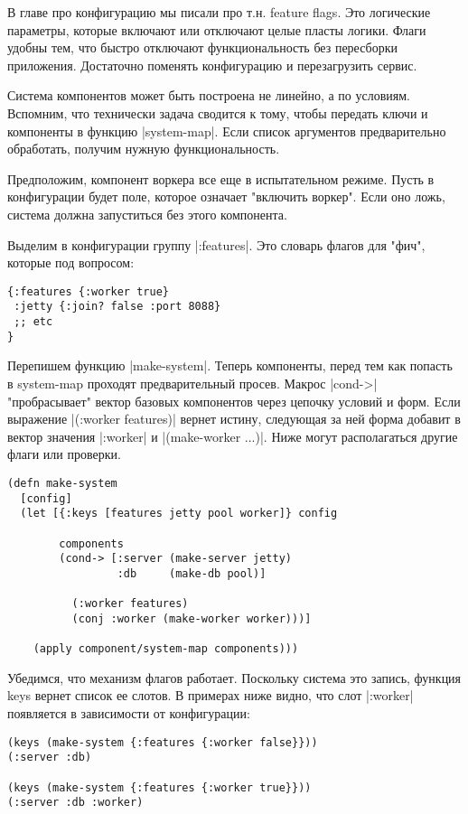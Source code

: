 В главе про конфигурацию мы писали про т.н. feature flags. Это логические
параметры, которые включают или отключают целые пласты логики. Флаги удобны тем,
что быстро отключают функциональность без пересборки приложения. Достаточно
поменять конфигурацию и перезагрузить сервис.

Система компонентов может быть построена не линейно, а по условиям. Вспомним,
что технически задача сводится к тому, чтобы передать ключи и компоненты в
функцию \spverb|system-map|. Если список аргументов предварительно обработать, получим
нужную функциональность.

Предположим, компонент воркера все еще в испытательном режиме. Пусть в
конфигурации будет поле, которое означает "включить воркер". Если оно ложь,
система должна запуститься без этого компонента.

Выделим в конфигурации группу \spverb|:features|. Это словарь флагов для "фич", которые
под вопросом:

\begin{verbatim}
{:features {:worker true}
 :jetty {:join? false :port 8088}
 ;; etc
}
\end{verbatim}

Перепишем функцию \spverb|make-system|. Теперь компоненты, перед тем как попасть в
system-map проходят предварительный просев. Макрос \spverb|cond->| "пробрасывает"
вектор базовых компонентов через цепочку условий и форм. Если выражение
\spverb|(:worker features)| вернет истину, следующая за ней форма добавит в вектор
значения \spverb|:worker| и \spverb|(make-worker {...})|. Ниже могут располагаться другие
флаги или проверки.

\begin{verbatim}
(defn make-system
  [config]
  (let [{:keys [features jetty pool worker]} config

        components
        (cond-> [:server (make-server jetty)
                 :db     (make-db pool)]

          (:worker features)
          (conj :worker (make-worker worker)))]

    (apply component/system-map components)))
\end{verbatim}

Убедимся, что механизм флагов работает. Поскольку система это запись, функция
keys вернет список ее слотов. В примерах ниже видно, что слот \spverb|:worker|
появляется в зависимости от конфигурации:

\begin{verbatim}
(keys (make-system {:features {:worker false}}))
(:server :db)

(keys (make-system {:features {:worker true}}))
(:server :db :worker)
\end{verbatim}

